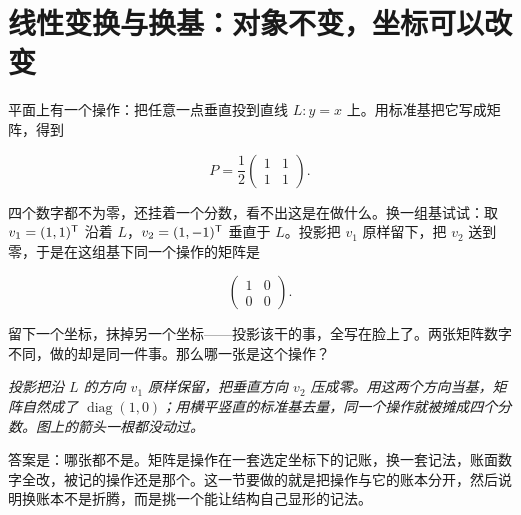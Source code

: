 \section{线性变换与换基：对象不变，坐标可以改变}
\label{sec:03-Linear-Algebra/02-Vector-Spaces/04}

平面上有一个操作：把任意一点垂直投到直线 \(L:y=x\) 上。用标准基把它写成矩阵，得到

\[
P=\frac{1}{2}\begin{pmatrix}1&1\\1&1\end{pmatrix}.
\]

四个数字都不为零，还挂着一个分数，看不出这是在做什么。换一组基试试：取 \(v_1=(1,1)^{\mathsf{T}}\) 沿着 \(L\)，\(v_2=(1,-1)^{\mathsf{T}}\) 垂直于 \(L\)。投影把 \(v_1\) 原样留下，把 \(v_2\) 送到零，于是在这组基下同一个操作的矩阵是

\[
\begin{pmatrix}1&0\\0&0\end{pmatrix}.
\]

留下一个坐标，抹掉另一个坐标——投影该干的事，全写在脸上了。两张矩阵数字不同，做的却是同一件事。那么哪一张是这个操作？

\begin{center}

\emph{投影把沿 \(L\) 的方向 \(v_1\) 原样保留，把垂直方向 \(v_2\) 压成零。用这两个方向当基，矩阵自然成了 \(\operatorname{diag}(1,0)\)；用横平竖直的标准基去量，同一个操作就被摊成四个分数。图上的箭头一根都没动过。}
\end{center}

答案是：哪张都不是。矩阵是操作在一套选定坐标下的记账，换一套记法，账面数字全改，被记的操作还是那个。这一节要做的就是把操作与它的账本分开，然后说明换账本不是折腾，而是挑一个能让结构自己显形的记法。

